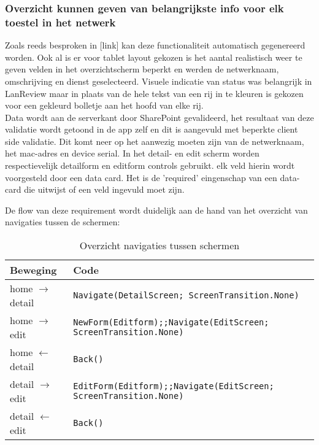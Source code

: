 \subsubsection{Overzicht kunnen geven van belangrijkste info voor elk toestel in het netwerk}

Zoals reeds besproken in [link] kan deze functionaliteit automatisch gegenereerd worden. Ook al is er voor tablet layout gekozen is het aantal realistisch weer te geven velden in het overzichtscherm beperkt en werden de netwerknaam, omschrijving en dienst geselecteerd. Visuele indicatie van status was belangrijk in LanReview maar in plaats van de hele tekst van een rij in te kleuren is gekozen voor een gekleurd bolletje aan het hoofd van elke rij.\\
Data wordt aan de serverkant door SharePoint gevalideerd, het resultaat van deze validatie wordt getoond in de app zelf en dit is aangevuld met beperkte client side validatie. Dit komt neer op het aanwezig moeten zijn van de netwerknaam, het mac-adres en device serial. In het detail- en edit scherm worden respectievelijk detailform en editform controls gebruikt. elk veld hierin wordt voorgesteld door een data card. Het is de 'required' eingenschap van een data-card die uitwijst of een veld ingevuld moet zijn.

De flow van deze requirement wordt duidelijk aan de hand van het overzicht van navigaties tussen de schermen:\\
\begin{table}[h!]
    \begin{tabular}{|l|l|}
        \hline
        \textbf{Beweging}         & \textbf{Code}                                                   \\ \hline
        home $\rightarrow$ detail & \lstinline|Navigate(DetailScreen; ScreenTransition.None)|                   \\ \hline
        home $\rightarrow$ edit   & \lstinline|NewForm(Editform);;Navigate(EditScreen; ScreenTransition.None)|  \\ \hline
        home $\leftarrow$ detail  & \lstinline|Back()|                                                          \\ \hline
        detail $\rightarrow$ edit & \lstinline|EditForm(Editform);;Navigate(EditScreen; ScreenTransition.None)| \\ \hline
        detail $\leftarrow$ edit  & \lstinline|Back()|                                                          \\ \hline
    \end{tabular}
    \caption{Overzicht navigaties tussen schermen}
    \label{tab:app-flow}
\end{table}

